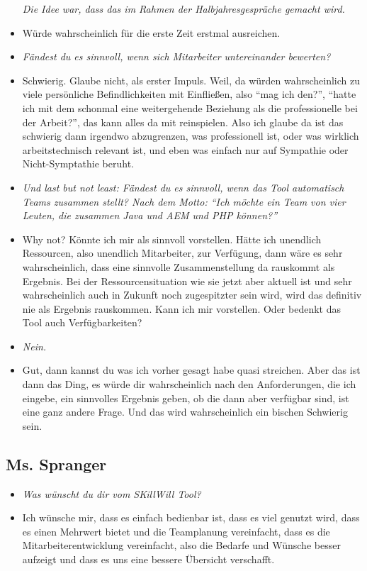 \begin{appendices}
\begin{itemize}
\textit{Die Idee war, dass das im Rahmen der Halbjahresgespräche gemacht wird.}
\item[] Würde wahrscheinlich für die erste Zeit erstmal ausreichen.

\item[] \textit{Fändest du es sinnvoll, wenn sich Mitarbeiter untereinander bewerten?}
\item[] Schwierig. Glaube nicht, als erster Impuls. Weil, da würden wahrscheinlich zu viele persönliche Befindlichkeiten mit Einfließen, also “mag ich den?”, “hatte ich mit dem schonmal eine weitergehende Beziehung als die professionelle bei der Arbeit?”, das kann alles da mit reinspielen. Also ich glaube da ist das schwierig dann irgendwo abzugrenzen, was professionell ist, oder was wirklich arbeitstechnisch relevant ist, und eben was einfach nur auf Sympathie oder Nicht-Symptathie beruht.

\item[] \textit{Und last but not least: Fändest du es sinnvoll, wenn das Tool automatisch Teams zusammen stellt? Nach dem Motto: “Ich möchte ein Team von vier Leuten, die zusammen Java und AEM und PHP können?”}
\item[] Why not? Könnte ich mir als sinnvoll vorstellen. Hätte ich unendlich Ressourcen, also unendlich Mitarbeiter, zur Verfügung, dann wäre es sehr wahrscheinlich, dass eine sinnvolle Zusammenstellung da rauskommt als Ergebnis. Bei der Ressourcensituation wie sie jetzt aber aktuell ist und sehr wahrscheinlich auch in Zukunft noch zugespitzter sein wird, wird das definitiv nie als Ergebnis rauskommen. Kann ich mir vorstellen. Oder bedenkt das Tool auch Verfügbarkeiten?

\item[] \textit{Nein.}
\item[] Gut, dann kannst du was ich vorher gesagt habe quasi streichen. Aber das ist dann das Ding, es würde dir wahrscheinlich nach den Anforderungen, die ich eingebe, ein sinnvolles Ergebnis geben, ob die dann aber verfügbar sind, ist eine ganz andere Frage. Und das wird wahrscheinlich ein bischen Schwierig sein.
\end{itemize}

\newpage

\subsection{Ms. Spranger}
\begin{itemize}
\item[] \textit{Was wünscht du dir vom SKillWill Tool?}
\item[] Ich wünsche mir, dass es einfach bedienbar ist, dass es viel genutzt wird, dass es einen Mehrwert bietet und die Teamplanung vereinfacht, dass es die Mitarbeiterentwicklung vereinfacht, also die Bedarfe und Wünsche besser aufzeigt und dass es uns eine bessere Übersicht verschafft.


\end{itemize}
\end{appendices}
